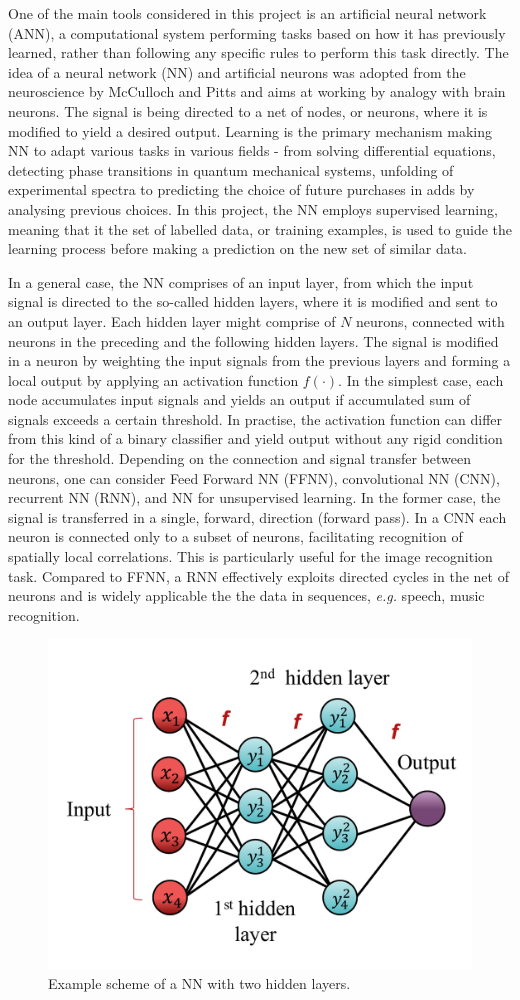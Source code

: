 \documentclass{emulateapj}
\begin{document}
One of the main tools considered in this project is an artificial neural network (ANN), a computational system performing tasks based on how it has previously learned, rather than following any specific rules to perform this task directly.  The idea of a neural network (NN) and artificial neurons was adopted from the neuroscience by McCulloch and Pitts \cite{pitts} and aims at working by analogy with brain neurons.  The signal is being directed to a net of nodes, or neurons, where it is modified to yield a desired output. Learning is the primary mechanism making NN to adapt various tasks in various fields - from solving differential equations, detecting phase transitions in quantum mechanical systems, unfolding of experimental spectra to predicting the choice of future purchases in adds by analysing previous choices. In this project, the NN employs supervised learning, meaning that it the set of labelled data, or training examples, is used to guide the learning process before making a prediction on the new set of similar data. 

In a general case, the NN comprises of an input layer, from which the input signal is directed to the so-called hidden layers, where it is modified and sent to an output layer. Each hidden layer might comprise of $N$ neurons, connected with neurons in the preceding and the following hidden layers. The signal is modified in a neuron by weighting the input signals from the previous layers and forming a local output by applying an activation function $f(\cdot)$. In the simplest case, each node accumulates input signals and yields an output if accumulated sum of signals exceeds a certain threshold. In practise, the activation function can differ from this kind of a binary classifier and yield output without any rigid condition for the threshold. Depending on the connection and signal transfer between neurons, one can consider Feed Forward NN (FFNN), convolutional NN (CNN), recurrent NN (RNN), and NN for unsupervised learning. In the former case, the signal is transferred in a single, forward, direction (forward pass). In a CNN each neuron is connected only to a subset of neurons, facilitating recognition of spatially local correlations. This is particularly useful for the image recognition task. Compared to FFNN, a RNN effectively exploits directed cycles in the net of neurons and is widely applicable the the data in sequences, \textit{e.g.} speech, music recognition. 

\begin{figure}[!htb]
    \centering
    \includegraphics[width=.39\textwidth]{Figures/NN.pdf}
    \caption{Example scheme of a NN with two hidden layers.}
    \label{fig:NN}
\end{figure}
\end{document}
